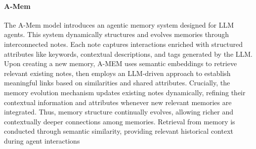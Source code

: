 \paragraph{A-Mem} The A-Mem model introduces an agentic memory system designed for LLM agents. This system dynamically structures and evolves memories through interconnected notes. Each note captures interactions enriched with structured attributes like keywords, contextual descriptions, and tags generated by the LLM. Upon creating a new memory, A-MEM uses semantic embeddings to retrieve relevant existing notes, then employs an LLM-driven approach to establish meaningful links based on similarities and shared attributes. Crucially, the memory evolution mechanism updates existing notes dynamically, refining their contextual information and attributes whenever new relevant memories are integrated. Thus, memory structure continually evolves, allowing richer and contextually deeper connections among memories. Retrieval from memory is conducted through semantic similarity, providing relevant historical context during agent interactions

